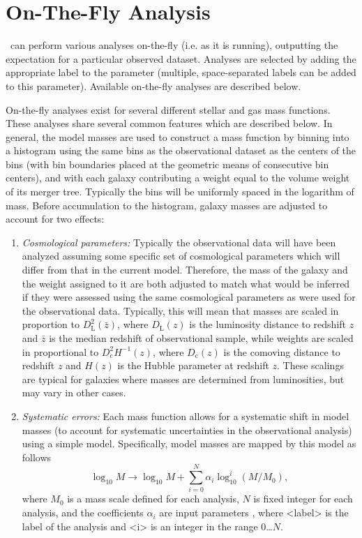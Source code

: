 \section{On-The-Fly Analysis}\label{sec:OnTheFlyAnalysis}

\glc\ can perform various analyses on-the-fly (i.e. as it is running), outputting the expectation for a particular observed dataset. Analyses are selected by adding the appropriate label to the {\normalfont \ttfamily [mergerTreeAnalyses]} parameter (multiple, space-separated labels can be added to this parameter). Available on-the-fly analyses are described below.

On-the-fly analyses exist for several different stellar and gas mass functions. These analyses share several common features which are described below. In general, the model masses are used to construct a mass function by binning into a histogram using the same bins as the observational dataset as the centers of the bins (with bin boundaries placed at the geometric means of consecutive bin centers), and with each galaxy contributing a weight equal to the volume weight of its merger tree. Typically the bins will be uniformly spaced in the logarithm of mass. Before accumulation to the histogram, galaxy masses are adjusted to account for two effects:
\begin{enumerate}
\item \emph{Cosmological parameters:} Typically the observational data will have been analyzed assuming some specific set of cosmological parameters which will differ from that in the current model. Therefore, the mass of the galaxy and the weight assigned to it are both adjusted to match what would be inferred if they were assessed using the same cosmological parameters as were used for the observational data. Typically, this will mean that masses are scaled in proportion to $D_{\mathrm L}^2(\bar{z})$, where $D_{\mathrm L}(z)$ is the luminosity distance to redshift $z$ and $\bar{z}$ is the median redshift of observational sample, while weights are scaled in proportional to $D_{\mathrm c}^2 H^{-1}(z)$, where $D_{\mathrm c}(z)$ is the comoving distance to redshift $z$ and $H(z)$ is the Hubble parameter at redshift $z$. These scalings are typical for galaxies where masses are determined from luminosities, but may vary in other cases.
\item \emph{Systematic errors:} Each mass function allows for a systematic shift in model masses (to account for systematic uncertainties in the observational analysis) using a simple model. Specifically, model masses are mapped by this model as follows
\begin{equation}
\log_{\mathrm 10} M \rightarrow \log_{10} M + \sum_{i=0}^N \alpha_i \log^i_{10}(M/M_0),
\end{equation}
where $M_0$ is a mass scale defined for each analysis, $N$ is fixed integer for each analysis, and the coefficients $\alpha_i$ are input parameters {\normalfont {}}, where {\normalfont \ttfamily \textless label\textgreater} is the label of the analysis and {\normalfont \ttfamily \textless i\textgreater} is an integer in the range 0\ldots$N$.
\end{enumerate}
